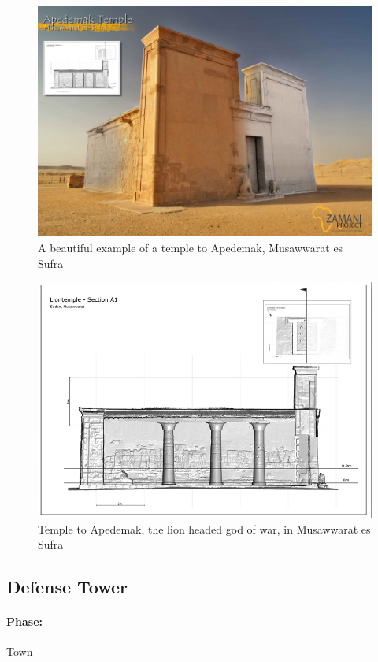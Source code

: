 \documentclass[a4paper,12pt]{scrreprt}
\begin{document}
\begin{figure}[H]
	\centering
	\includegraphics[width=\textwidth]{img/temple/apedemak_temple}
	\caption{A beautiful example of a temple to Apedemak, Musawwarat es Sufra}
\end{figure}

\begin{figure}[H]
	\centering
	\includegraphics[width=\textwidth]{img/temple/apedemak_temple_profile}
	\caption{Temple to Apedemak, the lion headed god of war, in Musawwarat es Sufra}
\end{figure}

\subsection{Defense Tower}

\paragraph{Phase:} Town\\
\end{document}
